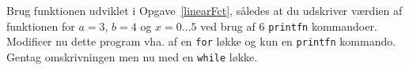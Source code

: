 \label{table} Brug funktionen udviklet i Opgave~\ref{linearFct}, således at du udskriver værdien af funktionen for $a=3$, $b=4$ og $x=0\ldots5$ ved brug af 6 \lstinline!printfn! kommandoer. Modificer nu dette program vha. af en \lstinline!for! løkke og kun en \lstinline!printfn! kommando. Gentag omskrivningen men nu med en \lstinline!while! løkke.
